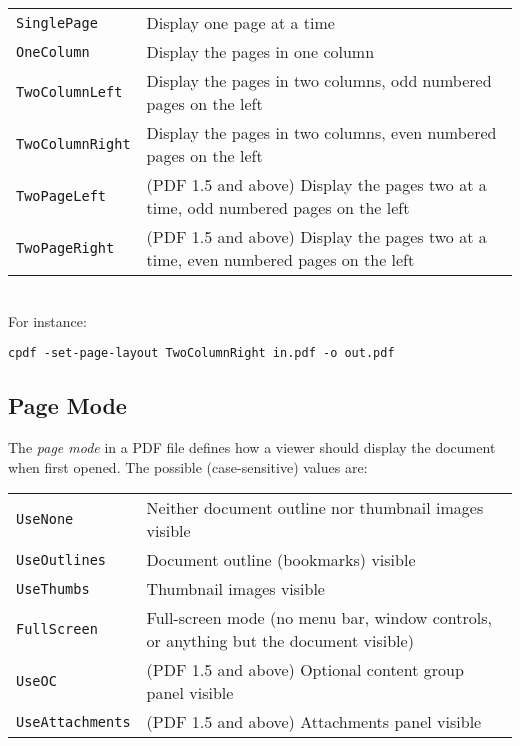 \documentclass{book}
\begin{document}
\vspace{2mm}
  {\small\begin{tabular}{ll}
    \texttt{SinglePage} & \vspace{2mm} \parbox{8cm}{Display one page at a time} \\
    \texttt{OneColumn} & \vspace{2mm} \parbox{8cm}{Display the pages in one column} \\
    \texttt{TwoColumnLeft} & \vspace{2mm} \parbox{8cm}{Display the pages in two columns, odd numbered pages on the left} \\
    \texttt{TwoColumnRight} & \vspace{2mm} \parbox{8cm}{Display the pages in two columns, even numbered pages on the left} \\
    \texttt{TwoPageLeft} & \vspace{2mm} \parbox{8cm}{(PDF 1.5 and above) Display the pages two at a time, odd numbered pages on the left} \\
    \texttt{TwoPageRight} & \vspace{2mm} \parbox{8cm}{(PDF 1.5 and above) Display the pages two at a time, even numbered pages on the left}
  \end{tabular}}\\

  \noindent For instance:
  \begin{framed}
    \small\verb!cpdf -set-page-layout TwoColumnRight in.pdf -o out.pdf!
  \end{framed}
  
  \subsection{Page Mode}
  The \textit{page mode} in a PDF file defines how a viewer should display the
document when first opened. The possible (case-sensitive) values are:

\vspace{2mm}
  {\small\begin{tabular}{ll}
    \texttt{UseNone} & \vspace{2mm} \parbox{8cm}{Neither document outline nor thumbnail images visible} \\
    \texttt{UseOutlines} & \vspace{2mm} \parbox{8cm}{Document outline (bookmarks) visible} \\
    \texttt{UseThumbs} & \vspace{2mm} \parbox{8cm}{Thumbnail images visible} \\
    \texttt{FullScreen} & \vspace{2mm} \parbox{8cm}{Full-screen mode (no menu bar, window controls, or anything but the document visible)} \\
    \texttt{UseOC} & \vspace{2mm} \parbox{8cm}{(PDF 1.5 and above) Optional content group panel visible} \\
    \texttt{UseAttachments} & \vspace{2mm} \parbox{8cm}{(PDF 1.5 and above) Attachments panel visible}
  \end{tabular}}\\
\end{document}

